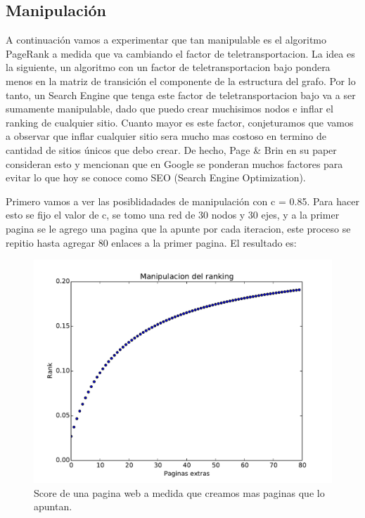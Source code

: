 \pagebreak
\subsection{Manipulación}

A continuación vamos a experimentar que tan manipulable es el algoritmo PageRank a medida que va cambiando el factor de teletransportacion. La idea es la siguiente, un algoritmo con un factor de teletransportacion bajo pondera menos en la matriz de transición el componente de la estructura del grafo. Por lo tanto, un Search Engine que tenga este factor de teletransportacion bajo va a ser sumamente manipulable, dado que puedo crear muchisimos nodos e inflar el ranking de cualquier sitio. Cuanto mayor es este factor, conjeturamos que vamos a observar que inflar cualquier sitio sera mucho mas costoso en termino de cantidad de sitios únicos que debo crear. De hecho, Page \& Brin en su paper consideran esto y mencionan que en Google se ponderan muchos factores para evitar lo que hoy se conoce como SEO (Search Engine Optimization).

Primero vamos a ver las posiblidadades de manipulación con c = 0.85. Para hacer esto se fijo el valor de c, se tomo una red de 30 nodos y 30 ejes, y a la primer pagina se le agrego una pagina que la apunte por cada iteracion, este proceso se repitio hasta agregar 80 enlaces a la primer pagina. El resultado es:

\begin{figure}[H]
\centering
\includegraphics[scale=0.7]{images/manipulacion.pdf}
\caption{Score de una pagina web a medida que creamos mas paginas que lo apuntan.}
\label{timePageRank}
\end{figure}

